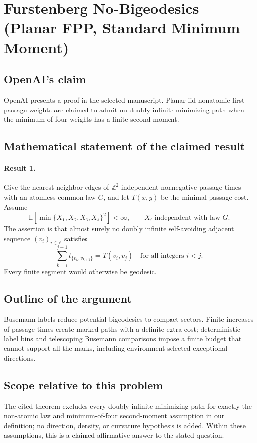 \documentclass[11pt]{article}
\begin{document}
\section*{Furstenberg No-Bigeodesics (Planar FPP, Standard Minimum Moment)}

\subsection{OpenAI's claim}
OpenAI presents a proof in the selected manuscript. Planar iid nonatomic first-passage weights are claimed to admit no doubly infinite minimizing path when the minimum of four weights has a finite second moment.

\subsection{Mathematical statement of the claimed result}
\paragraph{Result 1.} Give the nearest-neighbor edges of \(\mathbb Z^2\) independent nonnegative passage times with an atomless common law \(G\), and let \(T(x,y)\) be the minimal passage cost. Assume
\[
 \mathbb E[\min\{X_1,X_2,X_3,X_4\}^2]<\infty,
 \qquad X_i\text{ independent with law }G.
\]
The assertion is that almost surely no doubly infinite self-avoiding adjacent sequence \((v_i)_{i\in\mathbb Z}\) satisfies
\[
 \sum_{k=i}^{j-1}t_{\{v_k,v_{k+1}\}}=T(v_i,v_j)
 \quad\text{for all integers }i<j.
\]
Every finite segment would otherwise be geodesic.

\subsection{Outline of the argument}
Busemann labels reduce potential bigeodesics to compact sectors. Finite increases of passage times create marked paths with a definite extra cost; deterministic label bins and telescoping Busemann comparisons impose a finite budget that cannot support all the marks, including environment-selected exceptional directions.

\subsection{Scope relative to this problem}
The cited theorem excludes every doubly infinite minimizing path for exactly the non-atomic law and minimum-of-four second-moment assumption in our definition; no direction, density, or curvature hypothesis is added. Within these assumptions, this is a claimed affirmative answer to the stated question.
\end{document}

